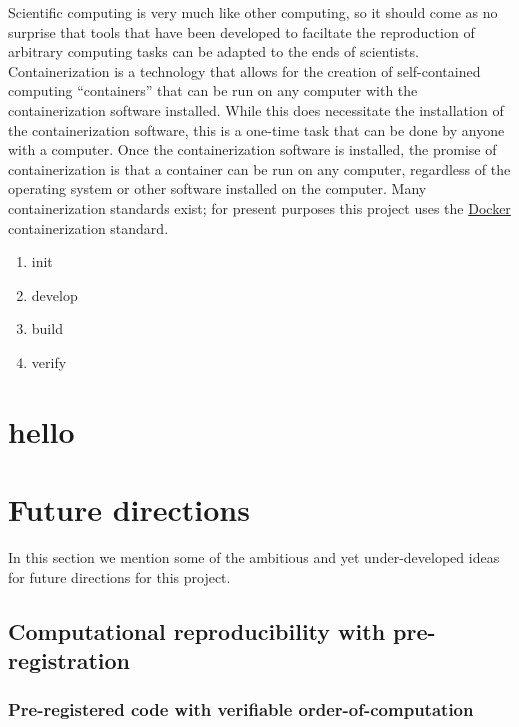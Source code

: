 Scientific computing is very much like other computing, so it should come as no surprise that tools that have been developed to faciltate the reproduction of arbitrary computing tasks can be adapted to the ends of scientists. Containerization is a technology that allows for the creation of self-contained computing ``containers'' that can be run on any computer with the containerization software installed. While this does necessitate the installation of the containerization software, this is a one-time task that can be done by anyone with a computer. Once the containerization software is installed, the promise of containerization is that a container can be run on any computer, regardless of the operating system or other software installed on the computer. Many containerization standards exist; for present purposes this project uses the \href{https://www.docker.com/}{Docker} containerization standard.

\begin{enumerate}
\itemsep -0.2em
\item init
\item develop
\item build
\item verify
\end{enumerate}

\hypertarget{hello}{%
\section{hello}\label{hello}}

\hypertarget{future-directions}{%
\section{Future directions}\label{future-directions}}

In this section we mention some of the ambitious and yet under-developed ideas for future directions for this project.

\hypertarget{computational-reproducibility-with-pre-registration}{%
\subsection{Computational reproducibility with pre-registration}\label{computational-reproducibility-with-pre-registration}}

\hypertarget{pre-registered-code-with-verifiable-order-of-computation}{%
\subsubsection{Pre-registered code with verifiable order-of-computation}\label{pre-registered-code-with-verifiable-order-of-computation}}

